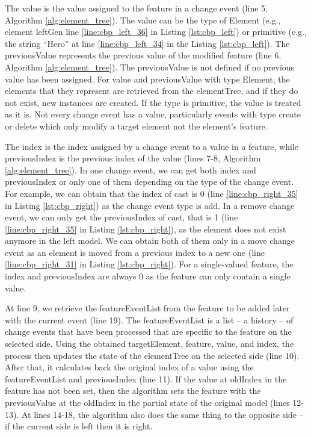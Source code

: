The \textsf{value} is the value assigned to the feature in a change event (line 5, Algorithm \ref{alg:element_tree}). The \textsf{value} can be the type of \textsf{Element} (e.g., element \textsf{leftGen} line \ref{line:cbp_left_36} in Listing \ref{lst:cbp_left}) or primitive (e.g., the string ``Hero'' at line \ref{line:cbp_left_34} in the Listing \ref{lst:cbp_left}). The \textsf{previousValue} represents the previous value of the modified feature (line 6, Algorithm \ref{alg:element_tree}). The \textsf{previousValue} is not defined if no previous value has been assigned. For \textsf{value} and \textsf{previousValue} with type \textsf{Element}, the elements that they represent are retrieved from the \textsf{elementTree}, and if they do not exist, new instances are created. If the type is primitive, the value is treated as it is. Not every change event has a \textsf{value}, particularly events with type \textsf{create} 
or \textsf{delete} which only modify a target element not the element's feature.

The \textsf{index} is the index assigned by a change event to a value in a feature, while \textsf{previousIndex} is the previous index of the value (lines 7-8, Algorithm \ref{alg:element_tree}). In one change event, we can get both \textsf{index} and \textsf{previousIndex} or only one of them depending on the type of the change event. For example, we can obtain that the \textsf{index} of \textsf{cast} is 0 (line \ref{line:cbp_right_35} in Listing \ref{lst:cbp_right}) as the change event type is \textsf{add}. In a \textsf{remove} change event, we can only get the \textsf{previousIndex} of \textsf{cast}, that is 1 (line \ref{line:cbp_right_35} in Listing \ref{lst:cbp_right}), as the element does not exist anymore in the left model. We can obtain both of them only in a \textsf{move} change event as an element is moved from a previous index to a new one (line \ref{line:cbp_right_31} in Listing \ref{lst:cbp_right}). For a single-valued feature, the \textsf{index} and \textsf{previousIndex} are always 0 as the feature can only contain a single value. 

At line 9, we retrieve the \textsf{featureEventList} from the \textsf{feature} to be added later with the current \textsf{event} (line 19). The \textsf{featureEventList} is a list -- a history -- of change events that have been processed that are specific to the \textsf{feature} on the selected \textsf{side}. Using the obtained \textsf{targetElement}, \textsf{feature}, \textsf{value}, and \textsf{index}, the process then updates the state of the \textsf{elementTree} on the selected \textsf{side} (line 10). After that, it calculates back the original index of a value using the \textsf{featureEventList} and \textsf{previousIndex} (line 11). If the value at \textsf{oldIndex} in the \textsf{feature} has not been set, then the algorithm sets the \textsf{feature} with the \textsf{previousValue} at the \textsf{oldIndex} in the partial state of the original model (lines 12-13). At lines 14-18, the algorithm also does the same thing to the opposite side -- if the current \textsf{side} is \textsf{left} then it is \textsf{right}.  

